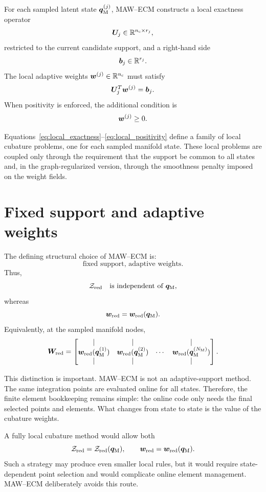 \documentclass[11pt,a4paper]{article}
\begin{document}
For each sampled latent state $\bm q_{\mathrm{M}}^{(j)}$, MAW--ECM constructs a local exactness
operator
\[
        \bm U_j \in \mathbb{R}^{n_{\mathrm{c}}\times r_j},
\]
restricted to the current candidate support, and a right-hand side
\[
        \bm b_j\in\mathbb{R}^{r_j}.
\]
The local adaptive weights $\bm w^{(j)}\in\mathbb{R}^{n_{\mathrm{c}}}$ must satisfy
\[
        \bm U_j^T\bm w^{(j)}=\bm b_j.
        \label{eq:local_exactness}
\]
When positivity is enforced, the additional condition is
\[
        \bm w^{(j)}\geq 0.
        \label{eq:local_positivity}
\]

Equations~\eqref{eq:local_exactness}--\eqref{eq:local_positivity} define a
family of local cubature problems, one for each sampled manifold state. These
local problems are coupled only through the requirement that the support be
common to all states and, in the graph-regularized version, through the
smoothness penalty imposed on the weight fields.

\section{Fixed support and adaptive weights}

The defining structural choice of MAW--ECM is:
\[
        \text{fixed support, adaptive weights}.
\]
Thus,
\[
        \mathcal{Z}_{\mathrm{red}}
        \quad\text{is independent of }\bm q_{\mathrm{M}},
\]
whereas
\[
        \bm w_{\mathrm{red}} = \bm w_{\mathrm{red}}(\bm q_{\mathrm{M}}).
\]
Equivalently, at the sampled manifold nodes,
\[
        \bm W_{\mathrm{red}}
        =
        \begin{bmatrix}
        | & | &        & | \\
        \bm w_{\mathrm{red}}(\bm q_{\mathrm{M}}^{(1)}) &
        \bm w_{\mathrm{red}}(\bm q_{\mathrm{M}}^{(2)}) &
        \cdots &
        \bm w_{\mathrm{red}}(\bm q_{\mathrm{M}}^{(N_{\mathrm{M}})}) \\
        | & | &        & |
        \end{bmatrix}.
\]

This distinction is important. MAW--ECM is not an adaptive-support method. The
same integration points are evaluated online for all states. Therefore, the
finite element bookkeeping remains simple: the online code only needs the final
selected points and elements. What changes from state to state is the value of
the cubature weights.

A fully local cubature method would allow both
\[
        \mathcal{Z}_{\mathrm{red}}=\mathcal{Z}_{\mathrm{red}}(\bm q_{\mathrm{M}}),
        \qquad
        \bm w_{\mathrm{red}}=\bm w_{\mathrm{red}}(\bm q_{\mathrm{M}}).
\]
Such a strategy may produce even smaller local rules, but it would require
state-dependent point selection and would complicate online element
management. MAW--ECM deliberately avoids this route.
\end{document}
